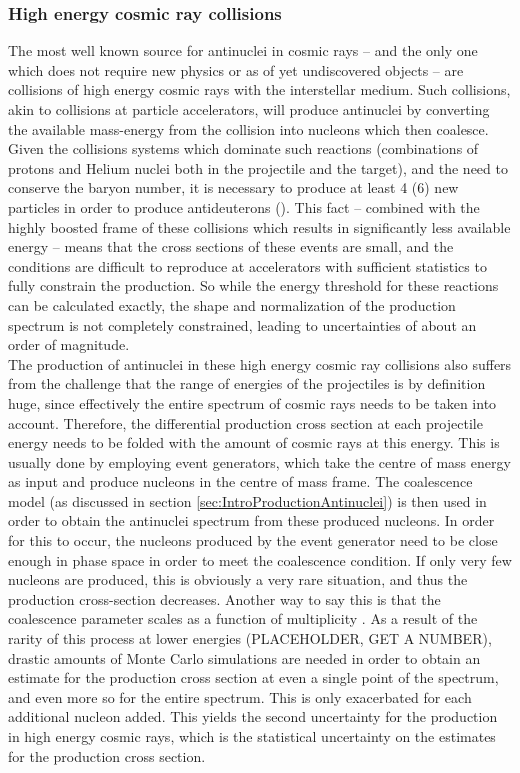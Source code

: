 \subsubsection{High energy cosmic ray collisions}
The most well known source for antinuclei in cosmic rays -- and the only one which does not require new physics or as of yet undiscovered objects -- are collisions of high energy cosmic rays with the interstellar medium. Such collisions, akin to collisions at particle accelerators, will produce antinuclei by converting the available mass-energy from the collision into nucleons which then coalesce. Given the collisions systems which dominate such reactions (combinations of protons and Helium nuclei both in the projectile and the target), and the need to conserve the baryon number, it is necessary to produce at least 4 (6) new particles in order to produce antideuterons (\ahe). This fact -- combined with the highly boosted frame of these collisions which results in significantly less available energy -- means that the cross sections of these events are small, and the conditions are difficult to reproduce at accelerators with sufficient statistics to fully constrain the production. So while the energy threshold for these reactions can be calculated exactly, the shape and normalization of the production spectrum is not completely constrained, leading to uncertainties of about an order of magnitude.\\

The production of antinuclei in these high energy cosmic ray collisions also suffers from the challenge that the range of energies of the projectiles is by definition huge, since effectively the entire spectrum of cosmic rays needs to be taken into account. Therefore, the differential production cross section at each projectile energy needs to be folded with the amount of cosmic rays at this energy. This is usually done by employing event generators, which take the centre of mass energy as input and produce nucleons in the centre of mass frame. The coalescence model (as discussed in section \ref{sec:IntroProductionAntinuclei}) is then used in order to obtain the antinuclei spectrum from these produced nucleons. In order for this to occur, the nucleons produced by the event generator need to be close enough in phase space in order to meet the coalescence condition. If only very few nucleons are produced, this is obviously a very rare situation, and thus the production cross-section decreases. Another way to say this is that the coalescence parameter scales as a function of multiplicity \cite{}. As a result of the rarity of this process at lower energies (PLACEHOLDER, GET A NUMBER), drastic amounts of Monte Carlo simulations are needed in order to obtain an estimate for the production cross section at even a single point of the spectrum, and even more so for the entire spectrum. This is only exacerbated for each additional nucleon added. This yields the second uncertainty for the production in high energy cosmic rays, which is the statistical uncertainty on the estimates for the production cross section.\\

